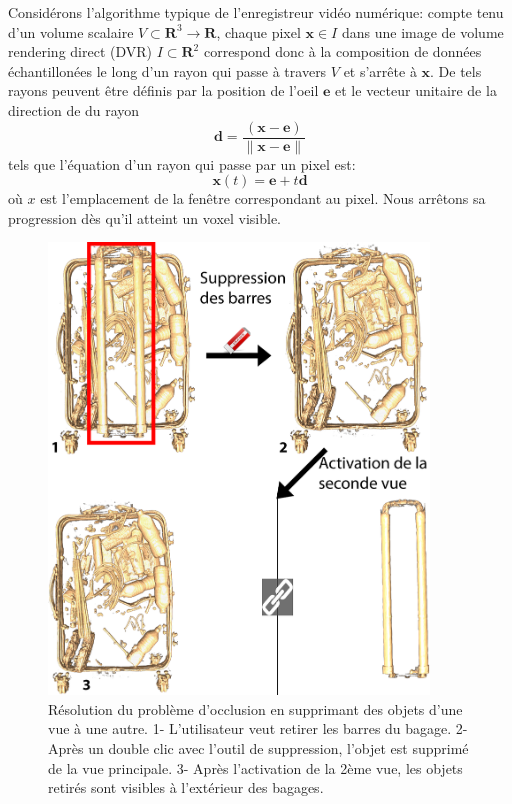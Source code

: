 Considérons l'algorithme typique de l'enregistreur vidéo numérique: compte tenu d'un volume scalaire $V \subset \mathbf{R}^3 \rightarrow \mathbf{R}$, chaque pixel $\mathbf{x} \in I$ dans une image de volume rendering direct (DVR) $I \subset \mathbf{R}^2$ correspond donc à la composition de données échantillonées le long d'un rayon qui passe à travers $V$ et s'arrête à $\mathbf{x}$. De tels rayons peuvent être définis par la position de l'oeil $\mathbf{e}$ et le vecteur unitaire de la direction de du rayon
\begin{equation}
\mathbf{d} = \frac{ (\mathbf{x} - \mathbf{e}) }{ \| \mathbf{x} - \mathbf{e} \| }
\end{equation}
tels que l'équation d'un rayon qui passe par un pixel est:
\begin{equation}
\mathbf{x}(t) =  \mathbf{e} + t\mathbf{d}
\end{equation}
où $x$ est l'emplacement de la fenêtre correspondant au pixel.
  Nous arrêtons sa progression dès qu’il atteint un voxel visible. 

\begin{figure}
\centering   
 \includegraphics[width=0.9\textwidth]{Figures/deletionfr.png}
	\caption[ Résolution du problème d'occlusion en supprimant des objets d'une vue à une autre.]{Résolution du problème d'occlusion en supprimant des objets d'une vue à une autre. 1- L'utilisateur veut retirer les barres du bagage. 2- Après un double clic avec l'outil de suppression, l'objet est supprimé de la vue principale. 3- Après l'activation de la 2ème vue, les objets retirés sont visibles à l'extérieur des bagages.}
	\label{f:deletionfr}
\end{figure}

